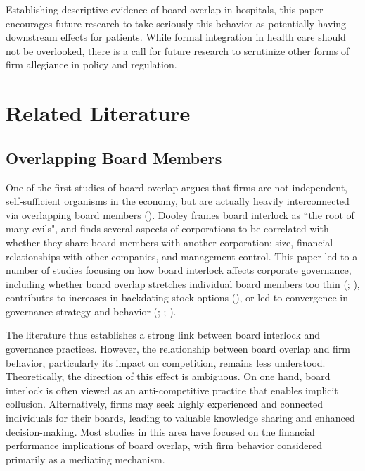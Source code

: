 \documentclass[12pt]{article}
\begin{document}
    Establishing descriptive evidence of board overlap in hospitals, this paper encourages future research to take seriously this behavior as potentially having downstream effects for patients. While formal integration in health care should not be overlooked, there is a call for future research to scrutinize other forms of firm allegiance in policy and regulation. 


    \section{Related Literature}\label{sec:relatedlit}


    \subsection{Overlapping Board Members}\label{sec:boardoverlaplit}

    One of the first studies of board overlap argues that firms are not independent, self-sufficient organisms in the economy, but are actually heavily interconnected via overlapping board members (\cite{dooley1969interlocking}). Dooley frames board interlock as ``the root of many evils", and finds several aspects of corporations to be correlated with whether they share board members with another corporation: size, financial relationships with other companies, and management control. This paper led to a number of studies focusing on how board interlock affects corporate governance, including whether board overlap stretches individual board members too thin (\cite{ferris2003too}; \cite{field2013busy}), contributes to increases in backdating stock options (\cite{bizjak2009option}), or led to convergence in governance strategy and behavior (\cite{bouwman2011corporate}; \cite{chiu2013board}; \cite{cai2014board}). 

    The literature thus establishes a strong link between board interlock and governance practices. However, the relationship between board overlap and firm behavior, particularly its impact on competition, remains less understood. Theoretically, the direction of this effect is ambiguous. On one hand, board interlock is often viewed as an anti-competitive practice that enables implicit collusion. Alternatively, firms may seek highly experienced and connected individuals for their boards, leading to valuable knowledge sharing and enhanced decision-making. Most studies in this area have focused on the financial performance implications of board overlap, with firm behavior considered primarily as a mediating mechanism.
\end{document}
